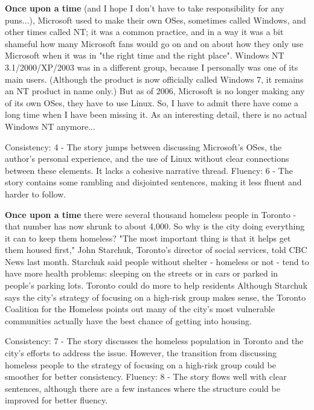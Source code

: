 \documentclass{article}
\begin{document}
\textbf{Once upon a time} (and I hope I don't have to take responsibility for any puns...), Microsoft used to make their own OSes, sometimes called Windows, and other times called NT; it was a common practice, and in a way it was a bit shameful how many Microsoft fans would go on and on about how they only use Microsoft when it was in "the right time and the right place". Windows NT 3.1/2000/XP/2003 was in a different group, because I personally was one of its main users. (Although the product is now officially called Windows 7, it remains an NT product in name only.) But as of 2006, Microsoft is no longer making any of its own OSes, they have to use Linux. So, I have to admit there have come a long time when I have been missing it. As an interesting detail, there is no actual Windows NT anymore...

Consistency: 4 - The story jumps between discussing Microsoft's OSes, the author's personal experience, and the use of Linux without clear connections between these elements. It lacks a cohesive narrative thread.
Fluency: 6 - The story contains some rambling and disjointed sentences, making it less fluent and harder to follow.

\textbf{Once upon a time} there were several thousand homeless people in Toronto - that number has now shrunk to about 4,000. So why is the city doing everything it can to keep them homeless? "The most important thing is that it helps get them housed first," John Starchuk, Toronto's director of social services, told CBC News last month. Starchuk said people without shelter - homeless or not - tend to have more health problems: sleeping on the streets or in cars or parked in people's parking lots. Toronto could do more to help residents Although Starchuk says the city's strategy of focusing on a high-risk group makes sense, the Toronto Coalition for the Homeless points out many of the city's most vulnerable communities actually have the best chance of getting into housing.

Consistency: 7 - The story discusses the homeless population in Toronto and the city's efforts to address the issue. However, the transition from discussing homeless people to the strategy of focusing on a high-risk group could be smoother for better consistency.
Fluency: 8 - The story flows well with clear sentences, although there are a few instances where the structure could be improved for better fluency.
\end{document}
